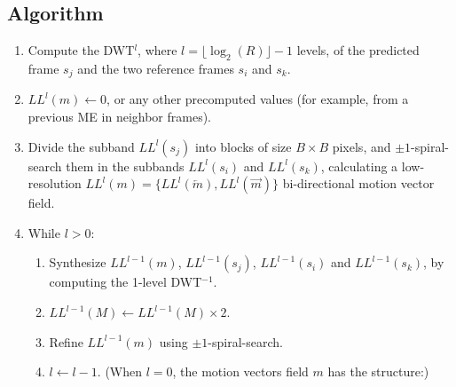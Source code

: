 \subsection{Algorithm}
\begin{enumerate}
\tightlist

\item
  Compute the DWT\(^l\), where \(l=\lfloor\log_2(R)\rfloor-1\) levels,
  of the predicted frame \(s_j\) and the two reference frames \(s_i\)
  and \(s_k\).

\item
  \(LL^l(m)\leftarrow 0\), or any other precomputed values (for example,
  from a previous ME in neighbor frames).

\item
  Divide the subband \(LL^l(s_j)\) into blocks of size \(B\times B\)
  pixels, and \(\pm 1\)-spiral-search them in the subbands \(LL^l(s_i)\)
  and \(LL^l(s_k)\), calculating a low-resolution
  \(LL^l(m)=\{LL^l(\overleftarrow{m}), LL^l(\overrightarrow{m})\}\)
  bi-directional motion vector field. 
\item
  While \(l>0\):
  
  \begin{enumerate}
    
  \item
    Synthesize \(LL^{l-1}(m)\), \(LL^{l-1}(s_j)\), \(LL^{l-1}(s_i)\)
    and \(LL^{l-1}(s_k)\), by computing the 1-level DWT\(^{-1}\).

  \item
    \(LL^{l-1}(M)\leftarrow LL^{l-1}(M)\times 2\).
  
  \item
    Refine \(LL^{l-1}(m)\) using \(\pm 1\)-spiral-search.
  
  \item
  \(l\leftarrow l-1\). (When \(l=0\), the motion vectors field \(m\)
  has the structure:)
  
  \end{enumerate}
  
  

\end{enumerate}
